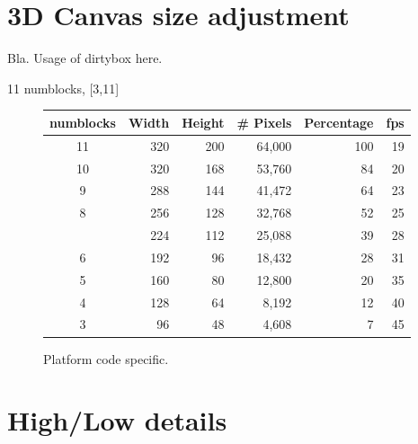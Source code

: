 \section{3D Canvas size adjustment}
Bla. Usage of dirtybox here.
\par
{}
\par
11 numblocks, [3,11]\\
\par
{}
\par


\begin{figure}[H]
\centering  
\begin{tabularx}{\textwidth}{ C{1}  R{1} R{1} R{1}  R{1.4}  R{0.6} }
  \toprule
  \textbf{numblocks} & \textbf{Width} & \textbf{Height} & \textbf{\# Pixels} & \textbf{Percentage} & \textbf{fps}\\
  \toprule 

11 & 320 & 200 & 64,000 & 100 & 19 \\
10 & 320 & 168 & 53,760 &  84 & 20 \\
 9 & 288 & 144 & 41,472 &  64 & 23 \\
 8 & 256 & 128 & 32,768 &  52 & 25 \\
 \protect{} & 224 & 112 & 25,088 &  39 & 28 \\
 6 & 192 & 96 & 18,432 &  28 & 31  \\
 5 & 160 & 80 & 12,800 &  20 & 35  \\
 4 & 128 & 64 &  8,192 &  12 & 40  \\
 3 &  96 & 48 &  4,608 &   7 & 45  \\
   \toprule
\end{tabularx}
\caption{Platform code specific.}
\end{figure}

\par


\section{High/Low details}

